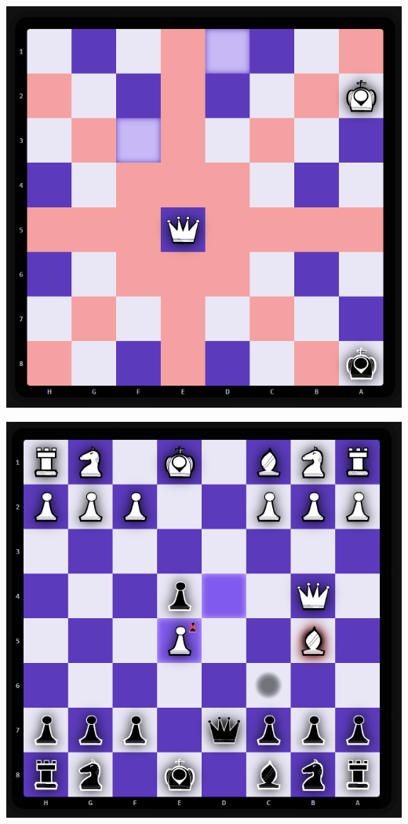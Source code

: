 \documentclass[twoside]{projektInzynierskiMS1}
\begin{document}
\vspace{0.5cm}
\noindent
\begin{minipage}[t]{0.45\textwidth} 
    \vspace{0pt} 
    \centering 
    \includegraphics[width=\linewidth]{images/imp_front_linear.png} 
\end{minipage} 
\hfill 
\begin{minipage}[t]{0.45\textwidth} 
    \vspace{0pt} 
    \centering 
    \includegraphics[width=\linewidth]{images/imp_front_pin.png} 
\end{minipage}
\vspace{0.5cm}
\end{document}
